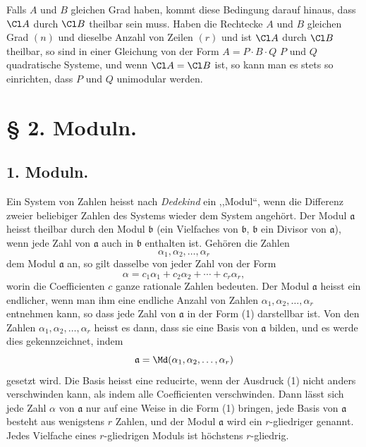 Falls $A$ und $B$ gleichen Grad haben, kommt diese Bedingung darauf hinaus, dass $\Cl A$ durch $\Cl B$ theilbar sein muss. Haben die Rechtecke $A$ und $B$ gleichen Grad $(n)$ und dieselbe Anzahl von Zeilen $(r)$ und ist $\Cl A$ durch $\Cl B$ theilbar, so sind in einer Gleichung von der Form $A=P\cdot B\cdot Q$ $P$ und $Q$ quadratische Systeme, und wenn $\Cl A=\Cl B$ ist, so kann man es stets so einrichten, dass $P$ und $Q$ unimodular werden.

\section*{§ 2. Moduln.}

\subsection*{1. Moduln.}

Ein System von Zahlen heisst nach \emph{Dedekind} ein ,,Modul``, wenn die Differenz zweier beliebiger Zahlen des Systems wieder dem System angehört. Der Modul $\mathfrak a$ heisst theilbar durch den Modul $\mathfrak b$ (ein Vielfaches von $\mathfrak b$, $\mathfrak b$ ein Divisor von $\mathfrak a$), wenn jede Zahl von $\mathfrak a$ auch in $\mathfrak b$ enthalten ist. Gehören die Zahlen
\[
 \alpha_1,\alpha_2,\ldots,\alpha_r
\]
dem Modul $\mathfrak a$ an, so gilt dasselbe von jeder Zahl von der Form
\begin{equation}
 \alpha=c_1\alpha_1+c_2\alpha_2+\cdots+c_r\alpha_r,
\tag{1}
\end{equation}
worin die Coefficienten $c$ ganze rationale Zahlen bedeuten. Der Modul $\mathfrak a$ heisst ein endlicher, wenn man ihm eine endliche Anzahl von Zahlen $\alpha_1,\alpha_2,\ldots,\alpha_r$ entnehmen kann, so dass jede Zahl von $\mathfrak a$ in der Form (1) darstellbar ist. Von den Zahlen $\alpha_1,\alpha_2,\ldots,\alpha_r$ heisst es dann, dass sie eine Basis von $\mathfrak a$ bilden, und es werde dies gekennzeichnet, indem
\[
 \mathfrak a=\Md(\alpha_1,\alpha_2,\ldots,\alpha_r)
\]
gesetzt wird. Die Basis heisst eine reducirte, wenn der Ausdruck (1) nicht anders verschwinden kann, als indem alle Coefficienten verschwinden. Dann lässt sich jede Zahl $\alpha$ von $\mathfrak a$ nur auf eine Weise in die Form (1) bringen, jede Basis von $\mathfrak a$ besteht aus wenigstens $r$ Zahlen, und der Modul $\mathfrak a$ wird ein $r$-gliedriger genannt. Jedes Vielfache eines $r$-gliedrigen Moduls ist höchstens $r$-gliedrig.

